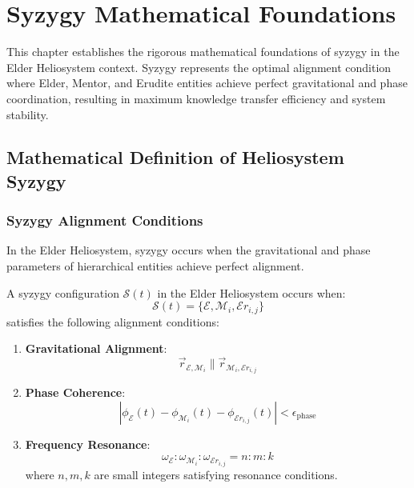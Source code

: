\chapter{Syzygy Mathematical Foundations}

\begin{tcolorbox}[colback=blue!5!white,colframe=blue!75!black,title=\textit{Chapter Summary}]
This chapter establishes the rigorous mathematical foundations of syzygy in the Elder Heliosystem context. Syzygy represents the optimal alignment condition where Elder, Mentor, and Erudite entities achieve perfect gravitational and phase coordination, resulting in maximum knowledge transfer efficiency and system stability.
\end{tcolorbox}

\section{Mathematical Definition of Heliosystem Syzygy}

\subsection{Syzygy Alignment Conditions}

In the Elder Heliosystem, syzygy occurs when the gravitational and phase parameters of hierarchical entities achieve perfect alignment.

\begin{definition}
\label{def:elder_syzygy}
A syzygy configuration $\mathcal{S}(t)$ in the Elder Heliosystem occurs when:
\begin{equation}
\mathcal{S}(t) = \{\mathcal{E}, \mathcal{M}_i, \mathcal{E}r_{i,j}\}
\end{equation}
satisfies the following alignment conditions:

\begin{enumerate}
    \item \textbf{Gravitational Alignment}: 
    \begin{equation}
    \vec{r}_{\mathcal{E},\mathcal{M}_i} \parallel \vec{r}_{\mathcal{M}_i,\mathcal{E}r_{i,j}}
    \end{equation}
    
    \item \textbf{Phase Coherence}:
    \begin{equation}
    |\phi_{\mathcal{E}}(t) - \phi_{\mathcal{M}_i}(t) - \phi_{\mathcal{E}r_{i,j}}(t)| < \epsilon_{\text{phase}}
    \end{equation}
    
    \item \textbf{Frequency Resonance}:
    \begin{equation}
    \omega_{\mathcal{E}} : \omega_{\mathcal{M}_i} : \omega_{\mathcal{E}r_{i,j}} = n : m : k
    \end{equation}
    where $n, m, k$ are small integers satisfying resonance conditions.
\end{enumerate}
\end{definition}

